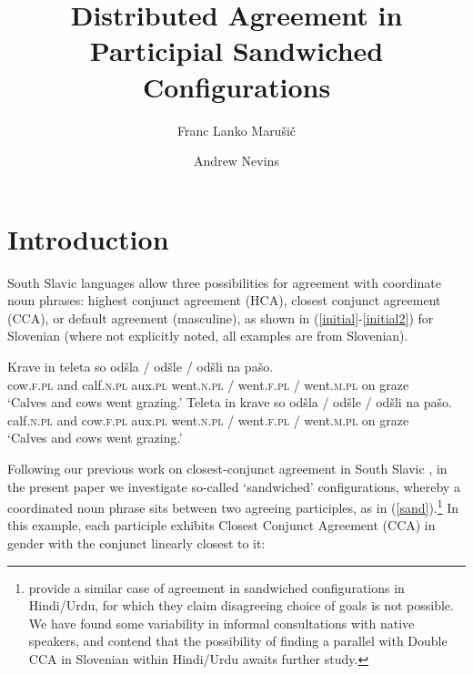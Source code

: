 \documentclass[output=paper
,modfonts
,nonflat]{langsci/langscibook}
\title{Distributed Agreement in Participial Sandwiched Configurations}
\author{
Franc Lanko Marušič\affiliation{University of Nova Gorica}\and 
Andrew Nevins\affiliation{University College London}
}
\begin{document}
\maketitle
\section{Introduction} 

South Slavic languages allow three possibilities for agreement with coordinate noun phrases: highest conjunct agreement (HCA), closest conjunct agreement (CCA), or default agreement (masculine), as shown in (\ref{initial}-\ref{initial2}) for Slovenian (where not explicitly noted, all examples are from Slovenian).

\begin{exe}
\ex \label{initial}
\gll Krave in teleta so odšla / odšle / odšli na pašo.\\
cow.\textsc{f.pl} and calf.\textsc{n.pl} aux.\textsc{pl} went.\textsc{n.pl} / went.\textsc{f.pl} / went.\textsc{m.pl} on graze\\
\glt `Calves and cows went grazing.'
\ex \label{initial2}
\gll Teleta in krave so odšla / odšle / odšli na pašo.\\
calf.\textsc{n.pl} and cow.\textsc{f.pl} aux.\textsc{pl} went.\textsc{n.pl} / went.\textsc{f.pl} / went.\textsc{m.pl} on graze\\
\glt `Calves and cows went grazing.'
\end{exe}
Following our previous work on closest-conjunct agreement in South Slavic \citep{marusicnevinssaksida:07,marusicnevinsbadecker:15,willergold:16}, in the present paper we investigate so-called `sandwiched' configurations, whereby a coordinated noun phrase sits between two agreeing participles, as in (\ref{sand}).\footnote{\citet{bhattwalkow:13} provide a similar case of agreement in sandwiched configurations in Hindi/Urdu, for which they claim disagreeing choice of goals is not possible. We have found some variability in informal consultations with native speakers, and contend that the possibility of finding a parallel with Double CCA in Slovenian within Hindi/Urdu awaits further study.} In this example, each participle exhibits Closest Conjunct Agreement (CCA) in gender with the conjunct linearly closest to it:
\end{document}
